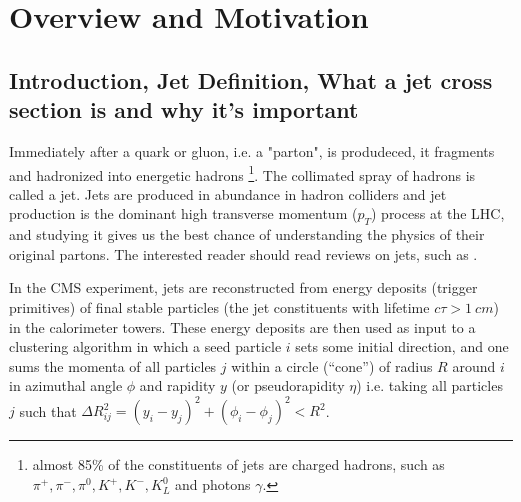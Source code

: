 \chapter{Overview and Motivation}
\section{Introduction, Jet Definition, What a jet cross section is and why it's important}
Immediately after a quark or gluon, i.e. a "parton", is produdeced, it fragments and hadronized into energetic hadrons \footnote{almost 85\% of the constituents of jets are charged hadrons, such as $\pi^{+}, \pi^{-}, \pi^{0}, K^{+}, K^{-}, K_{L}^{0}$ and photons $\gamma$. }. The collimated spray of hadrons is called a jet. Jets are produced in abundance in hadron colliders and jet production is the dominant high transverse momentum ($p_T$) process at the LHC, and studying it gives us the best chance of understanding the physics of their original partons. The interested reader should read reviews on jets, such as \cite{towards_jetography}.

In the CMS experiment, jets are reconstructed from energy deposits (trigger primitives) of final stable particles (the jet constituents with lifetime $c \tau > 1 \ cm$) in the calorimeter towers. These energy deposits are then used as input to a clustering algorithm in which a seed particle $i$ sets some initial direction, and one sums the momenta of all particles $j$ within a circle (“cone”) of radius $R$ around $i$ in azimuthal angle $\phi$ and rapidity $y$ (or pseudorapidity $\eta$)  i.e. taking all particles $j$ such that $\Delta R_{i j}^{2}=\left(y_{i}-y_{j}\right)^{2}+\left(\phi_{i}-\phi_{j}\right)^{2}<R^{2}$. 

